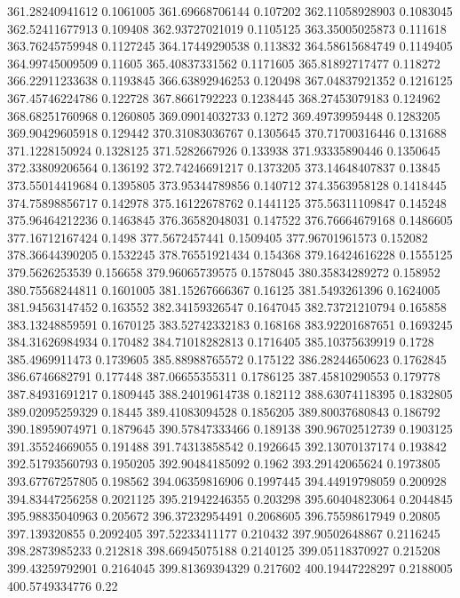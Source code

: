 361.28240941612 0.1061005
361.69668706144 0.107202
362.11058928903 0.1083045
362.52411677913 0.109408
362.93727021019 0.1105125
363.35005025873 0.111618
363.76245759948 0.1127245
364.17449290538 0.113832
364.58615684749 0.1149405
364.99745009509 0.11605
365.40837331562 0.1171605
365.81892717477 0.118272
366.22911233638 0.1193845
366.63892946253 0.120498
367.04837921352 0.1216125
367.45746224786 0.122728
367.8661792223 0.1238445
368.27453079183 0.124962
368.68251760968 0.1260805
369.09014032733 0.1272
369.49739959448 0.1283205
369.90429605918 0.129442
370.31083036767 0.1305645
370.71700316446 0.131688
371.1228150924 0.1328125
371.5282667926 0.133938
371.93335890446 0.1350645
372.33809206564 0.136192
372.74246691217 0.1373205
373.14648407837 0.13845
373.55014419684 0.1395805
373.95344789856 0.140712
374.3563958128 0.1418445
374.75898856717 0.142978
375.16122678762 0.1441125
375.56311109847 0.145248
375.96464212236 0.1463845
376.36582048031 0.147522
376.76664679168 0.1486605
377.16712167424 0.1498
377.5672457441 0.1509405
377.96701961573 0.152082
378.36644390205 0.1532245
378.76551921434 0.154368
379.16424616228 0.1555125
379.5626253539 0.156658
379.96065739575 0.1578045
380.35834289272 0.158952
380.75568244811 0.1601005
381.15267666367 0.16125
381.5493261396 0.1624005
381.94563147452 0.163552
382.34159326547 0.1647045
382.73721210794 0.165858
383.13248859591 0.1670125
383.52742332183 0.168168
383.92201687651 0.1693245
384.31626984934 0.170482
384.71018282813 0.1716405
385.10375639919 0.1728
385.4969911473 0.1739605
385.88988765572 0.175122
386.28244650623 0.1762845
386.6746682791 0.177448
387.06655355311 0.1786125
387.45810290553 0.179778
387.84931691217 0.1809445
388.24019614738 0.182112
388.63074118395 0.1832805
389.02095259329 0.18445
389.41083094528 0.1856205
389.80037680843 0.186792
390.18959074971 0.1879645
390.57847333466 0.189138
390.96702512739 0.1903125
391.35524669055 0.191488
391.74313858542 0.1926645
392.13070137174 0.193842
392.51793560793 0.1950205
392.90484185092 0.1962
393.29142065624 0.1973805
393.67767257805 0.198562
394.06359816906 0.1997445
394.44919798059 0.200928
394.83447256258 0.2021125
395.21942246355 0.203298
395.60404823064 0.2044845
395.98835040963 0.205672
396.37232954491 0.2068605
396.75598617949 0.20805
397.139320855 0.2092405
397.52233411177 0.210432
397.90502648867 0.2116245
398.2873985233 0.212818
398.66945075188 0.2140125
399.05118370927 0.215208
399.43259792901 0.2164045
399.81369394329 0.217602
400.19447228297 0.2188005
400.5749334776 0.22
